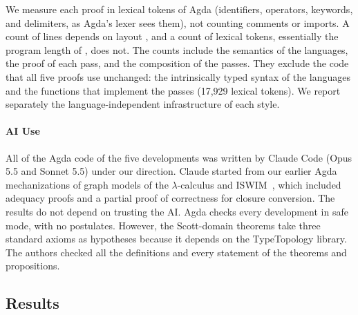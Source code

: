 We measure each proof in lexical tokens of Agda (identifiers,
operators, keywords, and delimiters, as Agda's lexer sees them), not
counting comments or imports. A count of lines depends on layout
\citep{Park:1992aa}, and a count of lexical tokens, essentially the
program length of \citet{Halstead:1977aa}, does not. The counts include
the semantics of the languages, the proof of each pass, and the
composition of the passes. They exclude the code that all five proofs
use unchanged: the intrinsically typed syntax of the languages and the
functions that implement the passes (17,929 lexical tokens). We report
separately the language-independent infrastructure of each style.

\paragraph{AI Use}

All of the Agda code of the five developments was written by Claude
Code (Opus 5.5 and Sonnet 5.5) under our direction. Claude started
from our earlier Agda mechanizations of graph models of the
$\lambda$-calculus and ISWIM~\citep{Landin:1966la}, which included
adequacy proofs and a partial proof of correctness for closure
conversion. The results do not depend on trusting the AI. Agda checks
every development in safe mode, with no postulates. However, the
Scott-domain theorems take three standard axioms as hypotheses because
it depends on the TypeTopology library. The authors checked all the
definitions and every statement of the theorems and propositions.

\subsection{Results}

